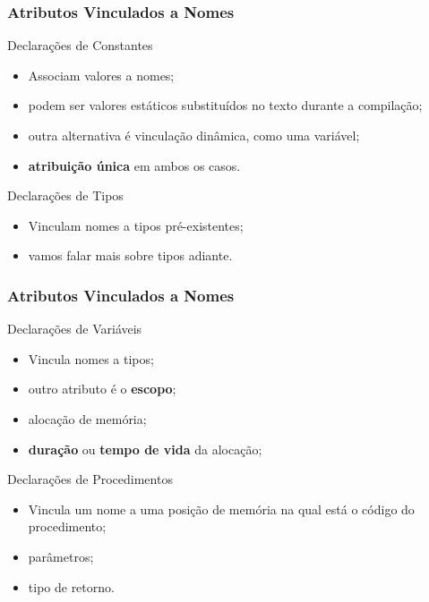 \documentclass[table]{beamer}
\begin{document}
\begin{frame}
   \frametitle{Atributos Vinculados a Nomes}
   \begin{block}{Declarações de Constantes}
   \begin{itemize}
      \item Associam valores a nomes;
      \item podem ser valores estáticos substituídos no texto durante a compilação;
      \item outra alternativa é vinculação dinâmica, como uma variável;
      \item \textbf{atribuição única} em ambos os casos.
   \end{itemize}
   \end{block}
   \begin{block}{Declarações de Tipos}
   \begin{itemize}
      \item Vinculam nomes a tipos pré-existentes;
      \item vamos falar mais sobre tipos adiante.
   \end{itemize}
   \end{block}
\end{frame}

\begin{frame}
   \frametitle{Atributos Vinculados a Nomes}
   \begin{block}{Declarações de Variáveis}
   \begin{itemize}
      \item Vincula nomes a tipos;
      \item outro atributo é o \textbf{escopo};
      \item alocação de memória;
      \item \textbf{duração} ou \textbf{tempo de vida} da alocação;
   \end{itemize}
   \end{block}
   \begin{block}{Declarações de Procedimentos}
   \begin{itemize}
      \item Vincula um nome a uma posição de memória na qual está o código do procedimento;
      \item parâmetros;
      \item tipo de retorno.
   \end{itemize}
   \end{block}
\end{frame}
\end{document}
